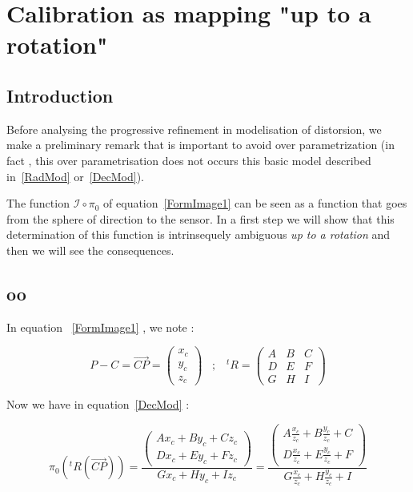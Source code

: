 
\section{Calibration as mapping "up to a rotation"}

\subsection{Introduction}

Before analysing the progressive refinement in modelisation of
distorsion, we  make a preliminary remark that is important
to avoid over parametrization (in fact , this over parametrisation
does not occurs this basic model described in~\ref{RadMod} or~\ref{DecMod}).


The function $\mathcal{I} \circ \pi_0$  of equation~\ref{FormImage1} can be seen as a function that
goes from the sphere of direction to the sensor.  In a first
step we will show that this determination of this function is intrinsequely ambiguous
\emph{up to a rotation} and then we will see the consequences.


\subsection{oo}

In equation ~\ref{FormImage1} , we note :

\begin{equation}
	P-C =  \overrightarrow{CP}  = \begin{pmatrix} x_c \\ y_c \\ z_c \end{pmatrix} 
\;\;\;  ;  \;\;\;
        ^t R =  \begin{pmatrix}  A & B & C \\ D & E & F \\ G & H & I \end{pmatrix} 
\end{equation}

Now we have in equation~\ref{DecMod} :

\begin{equation}
	\pi_0(^t R(\overrightarrow{CP})) 
	=  \frac{\begin{pmatrix} Ax_c+By_c+Cz_c \\ Dx_c+Ey_c+Fz_c  \end{pmatrix}}{Gx_c+Hy_c+Iz_c}
		=  \frac{\begin{pmatrix} A\frac{x_c}{z_c}+B\frac{y_c}{z_c}+C \\  D\frac{x_c}{z_c}+E\frac{y_c}{z_c}+F  \end{pmatrix}}
			{G\frac{x_c}{z_c}+H\frac{y_c}{z_c}+I}
\end{equation}

